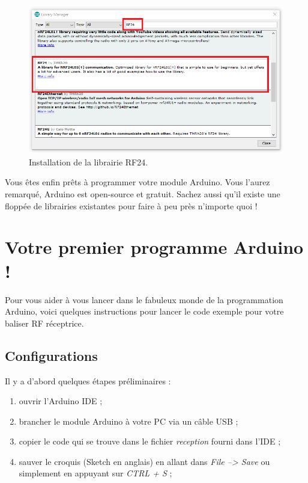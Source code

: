 \documentclass[a4paper,10pt,twoside]{article}
\begin{document}
\begin{figure}[ht!]
	\centering
	\includegraphics[width=\textwidth]{imgs/arduino_RF24.png}
	\caption{Installation de la librairie RF24.}
	\label{fig:arduino_RF24}
\end{figure}

Vous êtes enfin prêts à programmer votre module Arduino. Vous l'aurez remarqué, Arduino est open-source et gratuit. Sachez aussi qu'il existe une floppée de librairies existantes pour faire à peu près n'importe quoi !
 
\section{Votre premier programme Arduino !}
Pour vous aider à vous lancer dans le fabuleux monde de la programmation Arduino, voici quelques instructions pour lancer le code exemple pour votre baliser RF réceptrice. 

\subsection{Configurations}
Il y a d'abord quelques étapes préliminaires :
\begin{enumerate}
	\item ouvrir l'Arduino IDE ;
	\item brancher le module Arduino à votre PC via un câble USB ;
	\item copier le code qui se trouve dans le fichier \textit{reception} fourni dans l'IDE ; 
	\item sauver le croquis (Sketch en anglais) en allant dans \textit{File --> Save} ou simplement en appuyant sur \textit{CTRL + S} ;	
\end{enumerate}
\end{document}
